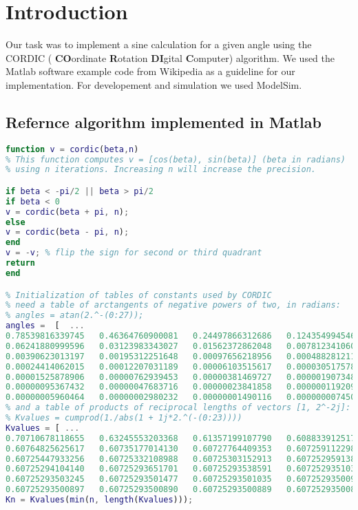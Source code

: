 \section{Introduction}
Our task was to implement a sine calculation for a given angle using the CORDIC ( \textbf{CO}ordinate \textbf{R}otation \textbf{DI}gital \textbf{C}omputer) algorithm. We used the Matlab software example code from Wikipedia \cite{cordic_algorithm} as a guideline for our implementation. For developement and simulation we used ModelSim.


\subsection{Refernce algorithm implemented in Matlab}

\begin{lstlisting}[language=Matlab]
function v = cordic(beta,n)
% This function computes v = [cos(beta), sin(beta)] (beta in radians)
% using n iterations. Increasing n will increase the precision.

if beta < -pi/2 || beta > pi/2
if beta < 0
v = cordic(beta + pi, n);
else
v = cordic(beta - pi, n);
end
v = -v; % flip the sign for second or third quadrant
return
end

% Initialization of tables of constants used by CORDIC
% need a table of arctangents of negative powers of two, in radians:
% angles = atan(2.^-(0:27));
angles =  [  ...
0.78539816339745   0.46364760900081   0.24497866312686   0.12435499454676 ...
0.06241880999596   0.03123983343027   0.01562372862048   0.00781234106010 ...
0.00390623013197   0.00195312251648   0.00097656218956   0.00048828121119 ...
0.00024414062015   0.00012207031189   0.00006103515617   0.00003051757812 ...
0.00001525878906   0.00000762939453   0.00000381469727   0.00000190734863 ...
0.00000095367432   0.00000047683716   0.00000023841858   0.00000011920929 ...
0.00000005960464   0.00000002980232   0.00000001490116   0.00000000745058 ];
% and a table of products of reciprocal lengths of vectors [1, 2^-2j]:
% Kvalues = cumprod(1./abs(1 + 1j*2.^(-(0:23))))
Kvalues = [ ...
0.70710678118655   0.63245553203368   0.61357199107790   0.60883391251775 ...
0.60764825625617   0.60735177014130   0.60727764409353   0.60725911229889 ...
0.60725447933256   0.60725332108988   0.60725303152913   0.60725295913894 ...
0.60725294104140   0.60725293651701   0.60725293538591   0.60725293510314 ...
0.60725293503245   0.60725293501477   0.60725293501035   0.60725293500925 ...
0.60725293500897   0.60725293500890   0.60725293500889   0.60725293500888 ];
Kn = Kvalues(min(n, length(Kvalues)));


\end{lstlisting}
